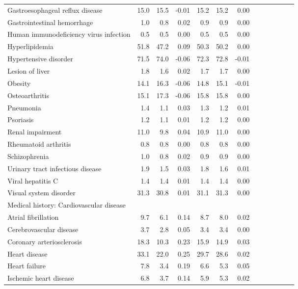 \documentclass[11pt,]{article}
\begin{document}
\begin{longtable}{lrrrrrrrrrrrr}
      Gastroesophageal reflux disease & 15.0 & 15.5 & -0.01 & 15.2 & 15.2 &  0.00 \\ 
      Gastrointestinal hemorrhage &  1.0 &  0.8 &  0.02 &  0.9 &  0.9 &  0.00 \\ 
      Human immunodeficiency virus infection &  0.5 &  0.5 &  0.00 &  0.5 &  0.5 &  0.00 \\ 
      Hyperlipidemia & 51.8 & 47.2 &  0.09 & 50.3 & 50.2 &  0.00 \\ 
      Hypertensive disorder & 71.5 & 74.0 & -0.06 & 72.3 & 72.8 & -0.01 \\ 
      Lesion of liver &  1.8 &  1.6 &  0.02 &  1.7 &  1.7 &  0.00 \\ 
      Obesity & 14.1 & 16.3 & -0.06 & 14.8 & 15.1 & -0.01 \\ 
      Osteoarthritis & 15.1 & 17.3 & -0.06 & 15.8 & 15.8 &  0.00 \\ 
      Pneumonia &  1.4 &  1.1 &  0.03 &  1.3 &  1.2 &  0.01 \\ 
      Psoriasis &  1.2 &  1.1 &  0.01 &  1.2 &  1.2 &  0.00 \\ 
      Renal impairment & 11.0 &  9.8 &  0.04 & 10.9 & 11.0 &  0.00 \\ 
      Rheumatoid arthritis &  0.8 &  0.8 &  0.00 &  0.8 &  0.8 &  0.00 \\ 
      Schizophrenia &  1.0 &  0.8 &  0.02 &  0.9 &  0.9 &  0.00 \\ 
      Urinary tract infectious disease &  1.9 &  1.5 &  0.03 &  1.8 &  1.6 &  0.01 \\ 
      Viral hepatitis C &  1.4 &  1.4 &  0.01 &  1.4 &  1.4 &  0.00 \\ 
      Visual system disorder & 31.3 & 30.8 &  0.01 & 31.1 & 31.3 &  0.00 \\ 
  Medical history: Cardiovascular disease &    &    &     &    &    &     \\ 
      Atrial fibrillation &  9.7 &  6.1 &  0.14 &  8.7 &  8.0 &  0.02 \\ 
      Cerebrovascular disease &  3.7 &  2.8 &  0.05 &  3.4 &  3.4 &  0.00 \\ 
      Coronary arteriosclerosis & 18.3 & 10.3 &  0.23 & 15.9 & 14.9 &  0.03 \\ 
      Heart disease & 33.1 & 22.0 &  0.25 & 29.7 & 28.6 &  0.02 \\ 
      Heart failure &  7.8 &  3.4 &  0.19 &  6.6 &  5.3 &  0.05 \\ 
      Ischemic heart disease &  6.8 &  3.7 &  0.14 &  5.9 &  5.3 &  0.02 \\ 

\end{longtable}
\end{document}
